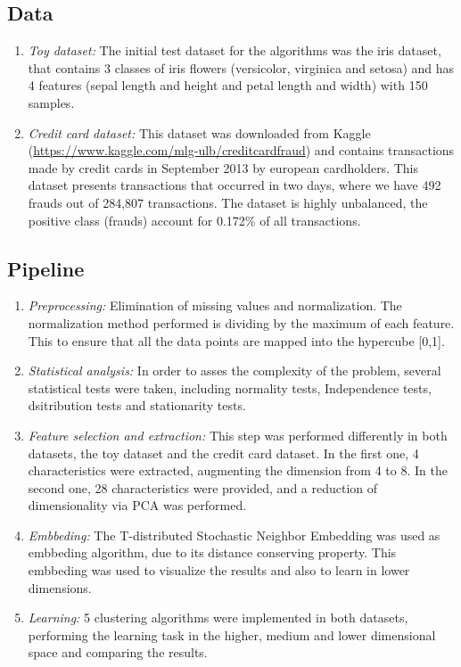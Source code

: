 \documentclass[conference]{IEEEtran}
\begin{document}
\subsection{Data}
\begin{enumerate}
    \item \textit{Toy dataset: }The initial test dataset for the algorithms was the iris dataset, that contains 3 classes of iris flowers (versicolor, virginica and setosa) and has 4 features (sepal length and height and petal length and width) with 150 samples.
    \item \textit{Credit card dataset: } This dataset was downloaded from Kaggle (\url{https://www.kaggle.com/mlg-ulb/creditcardfraud}) and contains transactions made by credit cards in September 2013 by european cardholders. This dataset presents transactions that occurred in two days, where we have 492 frauds out of 284,807 transactions. The dataset is highly unbalanced, the positive class (frauds) account for 0.172\% of all transactions.
\end{enumerate}

\subsection{Pipeline}
\begin{enumerate}
    \item \textit{Preprocessing: }Elimination of missing values and normalization. The normalization method performed is dividing by the maximum of each feature. This to ensure that all the data points are mapped into the hypercube [0,1].
    \item \textit{Statistical analysis:} In order to asses the complexity of the problem, several statistical tests were taken, including normality tests, Independence tests, dsitribution tests and stationarity tests. 
    \item \textit{Feature selection and extraction: }This step was performed differently in both datasets, the toy dataset and the credit card dataset. In the first one, 4 characteristics were extracted, augmenting the dimension from 4 to 8. In the second one, 28 characteristics were provided, and a reduction of dimensionality via PCA was performed.
    \item \textit{Embbeding: }The T-distributed Stochastic Neighbor Embedding was used as embbeding algorithm, due to its distance conserving property. This embbeding was used to visualize the results and also to learn in lower dimensions.
    \item \textit{Learning: }5 clustering algorithms were implemented in both datasets, performing the learning task in the higher, medium and lower dimensional space and comparing the results.
\end{enumerate}
\end{document}

